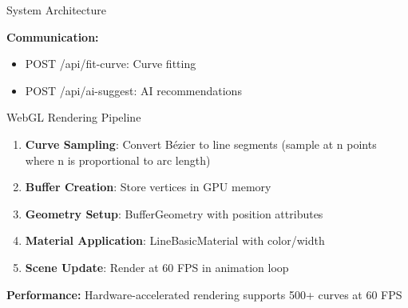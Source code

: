\documentclass{beamer}
\begin{document}
\begin{frame}{System Architecture}
\begin{center}
\end{center}

\textbf{Communication:}
\begin{itemize}
    \item POST /api/fit-curve: Curve fitting
    \item POST /api/ai-suggest: AI recommendations
\end{itemize}
\end{frame}

\begin{frame}{WebGL Rendering Pipeline}
\begin{enumerate}
    \item \textbf{Curve Sampling}: Convert Bézier to line segments (sample at n points where n is proportional to arc length)
    
    \item \textbf{Buffer Creation}: Store vertices in GPU memory
    
    \item \textbf{Geometry Setup}: BufferGeometry with position attributes
    
    \item \textbf{Material Application}: LineBasicMaterial with color/width
    
    \item \textbf{Scene Update}: Render at 60 FPS in animation loop
\end{enumerate}

\vspace{1em}

\textbf{Performance:} Hardware-accelerated rendering supports 500+ curves at 60 FPS
\end{frame}
\end{document}
